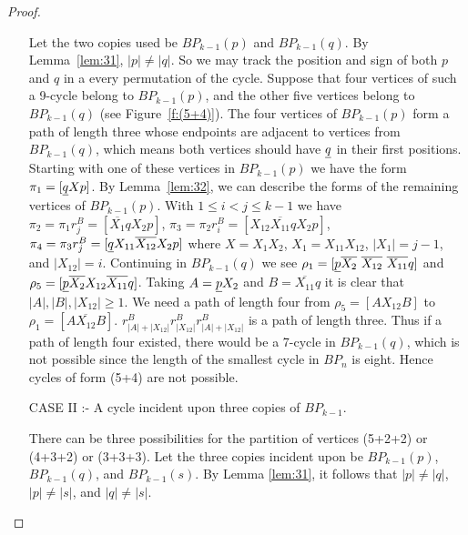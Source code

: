 \documentclass[final]{dmtcs-episciences}
\numberwithin{equation}{section}
\begin{document}
\begin{proof}
\begin{enumerate}
Let the two copies used be $BP_{k-1}(p)$ and $BP_{k-1}(q)$. By Lemma~\ref{lem:31}, $|p| \neq |q|$. So we may track the position and sign of both $p$ and $q$ in a every permutation of the cycle. Suppose that four vertices of such a 9-cycle belong to $BP_{k-1}(p)$, and the other five vertices belong to $BP_{k-1}(q)$ (see Figure~\ref{f:(5+4)}). The four vertices of $BP_{k-1}(p)$ form a path of length three whose endpoints are adjacent to vertices from $BP_{k-1}(q)$, which means both vertices should have $\uline{q}$ in their first positions. Starting with one of these vertices in $BP_{k-1}(p)$ we have the form $\pi_{1}=[\uline{q} X p]$. By Lemma~\ref{lem:32}, we can describe the forms of the remaining vertices of $BP_{k-1}(p)$. With $1 \leq i < j \leq k-1$ we have $\pi_{2}=\pi_{1}r^B_j=[\overline{X_1} q X_2 p]$, $\pi_{3}=\pi_{2}r^B_i=[X_{12} \overline{X_{11}} q X_2 p]$, $\pi_{4}=\pi_{3}r^B_j=[\uline{q} X_{11} \overline{X_{12}} X_2 p]$  where $X=X_1X_2$, $X_1 = X_{11}X_{12}$, $|X_1|=j-1$, and $|X_{12}|=i$. Continuing in $BP_{k-1}(q)$ we see $\rho_{1} = [\uline{p} \overline{X_2} \ \overline{X_{12}} \ \overline{X_{11}} q]$ and $\rho_{5} = [\uline{p} \overline{X_2} X_{12} \overline{X_{11}} q]$. Taking $A = \uline{p}X_2$ and $B=\overline{X_{11}}q$ it is clear that $|A|,|B|,|X_{12}| \geq 1$. We need a path of length four from $\rho_5=[A X_{12} B]$ to $\rho_1=[A \overline{X_{12}} B]$. $r^B_{|A|+|X_{12}|}r^B_{|X_{12}|}r^B_{|A|+|X_{12}|}$ is a path of length three. Thus if a path of length four existed, there would be a 7-cycle in $BP_{k-1}(q)$, which is not possible since the length of the smallest cycle in $BP_n$ is eight. Hence cycles of form (5+4) are not possible.

\item[CASE II :-] A cycle incident upon three copies of $BP_{k-1}$.

There can be three possibilities for the partition of vertices (5+2+2) or (4+3+2) or (3+3+3). Let the three copies incident upon be $BP_{k-1}(p)$, $BP_{k-1}(q)$, and $BP_{k-1}(s)$. By Lemma \ref{lem:31}, it follows that $|p|\neq |q|$, $|p| \neq |s|$, and $|q| \neq |s|$. 


\end{enumerate}
\end{proof}
\end{document}
